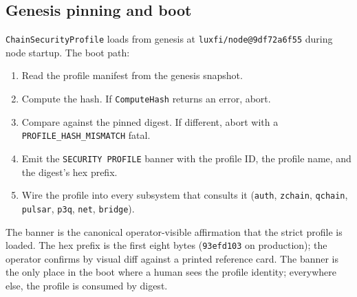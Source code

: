 \subsection{Genesis pinning and boot}

\texttt{ChainSecurityProfile} loads from genesis at \texttt{luxfi/node@9df72a6f55}
during node startup. The boot path:

\begin{enumerate}[leftmargin=2em,nosep]
  \item Read the profile manifest from the genesis snapshot.
  \item Compute the hash. If \texttt{ComputeHash} returns an error, abort.
  \item Compare against the pinned digest. If different, abort with a
    \texttt{PROFILE\_HASH\_MISMATCH} fatal.
  \item Emit the \texttt{SECURITY PROFILE} banner with the profile ID, the
    profile name, and the digest's hex prefix.
  \item Wire the profile into every subsystem that consults it
    (\texttt{auth}, \texttt{zchain}, \texttt{qchain}, \texttt{pulsar},
    \texttt{p3q}, \texttt{net}, \texttt{bridge}).
\end{enumerate}

The banner is the canonical operator-visible affirmation that the strict
profile is loaded. The hex prefix is the first eight bytes
(\texttt{93efd103} on production); the operator confirms by visual diff
against a printed reference card. The banner is the only place in the boot
where a human sees the profile identity; everywhere else, the profile is
consumed by digest.
